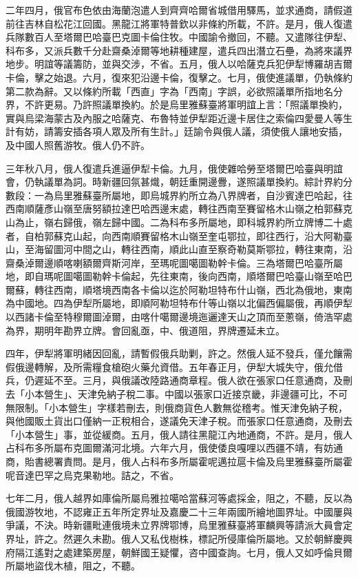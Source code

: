 \begin{pinyinscope}
二年四月，俄官布色依由海蘭泡遣人到齊齊哈爾省城借用驛馬，並求通商，請假道前往吉林自松花江回國。黑龍江將軍特普欽以非條約所載，不許。是月，俄人復遣兵隊數百人至塔爾巴哈臺巴克圖卡倫住牧。中國諭令撤回，不聽。又遣隊往伊犁、科布多，又派兵數千分赴齋桑淖爾等地耕種建屋，遣兵四出潛立石壘，為將來議界地步。明誼等議籌防，並與交涉，不省。五月，俄人以哈薩克兵犯伊犁博羅胡吉爾卡倫，擊之始退。六月，復來犯沿邊卡倫，復擊之。七月，俄使進議單，仍執條約第二款為辭。又以條約所載「西直」字為「西南」字誤，必欲照議單所指地名分界，不許更易。乃許照議單換約。於是烏里雅蘇臺將軍明誼上言：「照議單換約，實與烏梁海蒙古及內服之哈薩克、布魯特並伊犁距近邊卡居住之索倫四愛曼人等生計有妨，請籌安插各項人眾及所有生計。」廷諭令與俄人議，須使俄人讓地安插，及中國人照舊游牧。俄人仍不許。

三年秋八月，俄人復遣兵進逼伊犁卡倫。九月，俄使雜哈勞至塔爾巴哈臺與明誼會，仍執議單為詞。時新疆回氛甚熾，朝廷重開邊釁，遂照議單換約。綜計界約分數段：一為烏里雅蘇臺所屬地，即烏城界約所立為八界牌者，自沙賓達巴哈起，往西南順薩彥山嶺至唐努額拉達巴哈西邊末處，轉往西南至賽留格木山嶺之柏郭蘇克山為止，嶺右歸俄，嶺左歸中國。二為科布多所屬地，即科城界約所立牌博二十處者，自柏郭蘇克山起，向西南順賽留格木山嶺至奎屯鄂拉，即往西行，沿大阿勒臺山，至海留圖河中間之山，轉往西南，順此山直至察奇勒莫斯鄂拉，轉往東南，沿齋桑淖爾邊順喀喇額爾齊斯河岸，至瑪呢圖噶圖勒幹卡倫。三為塔爾巴哈臺所屬地，即自瑪呢圖噶圖勒幹卡倫起，先往東南，後向西南，順塔爾巴哈臺山嶺至哈巴爾蘇，轉往西南，順塔境西南各卡倫以迄於阿勒坦特布什山嶺，西北為俄地，東南為中國地。四為伊犁所屬地，即順阿勒坦特布什等山嶺以北偏西偏屬俄，再順伊犁以西諸卡倫至特穆爾圖淖爾，由喀什噶爾邊境迤邐達天山之頂而至蔥嶺，倚浩罕處為界，期明年勘界立牌。會回亂亟，中、俄道阻，界牌遷延未立。

四年，伊犁將軍明緒因回亂，請暫假俄兵助剿，許之。然俄人延不發兵，僅允饟需假俄邊轉解，及所需糧食槍砲火藥允資借。五年春正月，伊犁大城失守，俄允借兵，仍遲延不至。三月，與俄議改陸路通商章程。俄人欲在張家口任意通商，及刪去「小本營生」、天津免納子稅二事。中國以張家口近接京畿，非邊疆可比，不可無限制。「小本營生」字樣若刪去，則俄商貨色人數無從稽考。惟天津免納子稅，與他國販土貨出口僅納一正稅相合，遂議免天津子稅。而張家口任意通商，及刪去「小本營生」事，並從緩商。五月，俄人請往黑龍江內地通商，不許。是月，俄人占科布多所屬布克圖爾滿河北境。六年六月，俄使倭良嘎哩以西疆不靖，有妨通商，貽書總署責問。是月，俄人占科布多所屬霍呢邁拉扈卡倫及烏里雅蘇臺所屬霍呢音達巴罕之烏克果勒地。詰之，不省。

七年二月，俄人越界如庫倫所屬烏雅拉噶哈當蘇河等處採金，阻之，不聽，反以為俄國游牧地，不認雍正五年所定界址及嘉慶二十三年兩國所繪地圖界址。中國屢與爭議，不決。時新疆毗連俄境未立界牌鄂博，烏里雅蘇臺將軍麟興等請派大員會定界址，許之。然遲久未勘。俄人又私伐樹株，標記所侵庫倫所屬地。又於朝鮮慶興府隔江遙對之處建築房屋，朝鮮國王疑懼，咨中國查詢。七月，俄人又如呼倫貝爾所屬地盜伐木植，阻之，不聽。


\end{pinyinscope}
